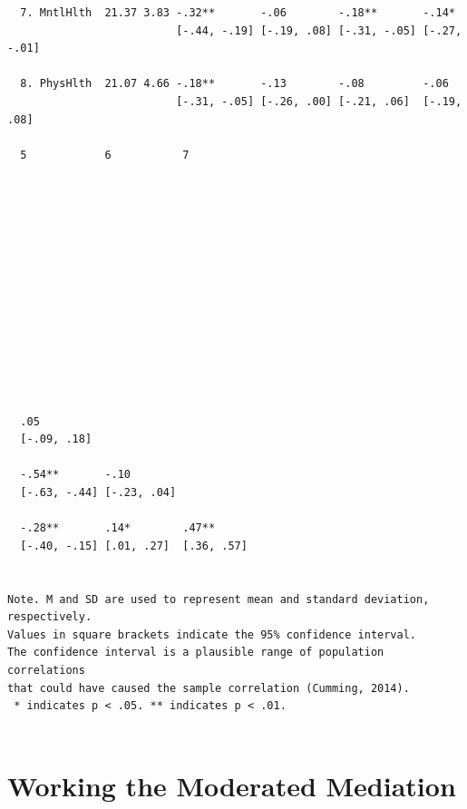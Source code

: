 \documentclass[
  11pt,
]{book}
\begin{document}
\begin{verbatim}
  7. MntlHlth  21.37 3.83 -.32**       -.06        -.18**       -.14*       
                          [-.44, -.19] [-.19, .08] [-.31, -.05] [-.27, -.01]
                                                                            
  8. PhysHlth  21.07 4.66 -.18**       -.13        -.08         -.06        
                          [-.31, -.05] [-.26, .00] [-.21, .06]  [-.19, .08] 
                                                                            
  5            6           7         
                                     
                                     
                                     
                                     
                                     
                                     
                                     
                                     
                                     
                                     
                                     
                                     
                                     
                                     
  .05                                
  [-.09, .18]                        
                                     
  -.54**       -.10                  
  [-.63, -.44] [-.23, .04]           
                                     
  -.28**       .14*        .47**     
  [-.40, -.15] [.01, .27]  [.36, .57]
                                     

Note. M and SD are used to represent mean and standard deviation, respectively.
Values in square brackets indicate the 95% confidence interval.
The confidence interval is a plausible range of population correlations 
that could have caused the sample correlation (Cumming, 2014).
 * indicates p < .05. ** indicates p < .01.
 
\end{verbatim}

\hypertarget{working-the-moderated-mediation}{%
\section{Working the Moderated Mediation}\label{working-the-moderated-mediation}}
\end{document}
